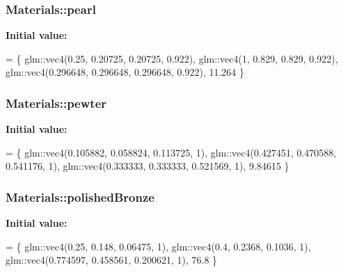 \subsubsection[{\texorpdfstring{pearl}{pearl}}]{ Materials\+::pearl}\hypertarget{namespace_materials_a3b1f30a53ed581645b32a371a3f18518}{}\label{namespace_materials_a3b1f30a53ed581645b32a371a3f18518}
{\bfseries Initial value\+:}
\begin{DoxyCode}
= \{
        glm::vec4(0.25, 0.20725, 0.20725, 0.922),
        glm::vec4(1, 0.829, 0.829, 0.922),
        glm::vec4(0.296648, 0.296648, 0.296648, 0.922),
        11.264
    \}
\end{DoxyCode}
\subsubsection[{\texorpdfstring{pewter}{pewter}}]{ Materials\+::pewter}\hypertarget{namespace_materials_a125b4c95ab2ef64d802378762572abea}{}\label{namespace_materials_a125b4c95ab2ef64d802378762572abea}
{\bfseries Initial value\+:}
\begin{DoxyCode}
= \{
        glm::vec4(0.105882, 0.058824, 0.113725, 1),
        glm::vec4(0.427451, 0.470588, 0.541176, 1),
        glm::vec4(0.333333, 0.333333, 0.521569, 1),
        9.84615
    \}
\end{DoxyCode}
\subsubsection[{\texorpdfstring{polished\+Bronze}{polishedBronze}}]{ Materials\+::polished\+Bronze}\hypertarget{namespace_materials_a74ca93b9b8f4b91eac56e29dcf2f4fb4}{}\label{namespace_materials_a74ca93b9b8f4b91eac56e29dcf2f4fb4}
{\bfseries Initial value\+:}
\begin{DoxyCode}
= \{
        glm::vec4(0.25, 0.148, 0.06475, 1),
        glm::vec4(0.4, 0.2368, 0.1036, 1),
        glm::vec4(0.774597, 0.458561, 0.200621, 1),
        76.8
    \}
\end{DoxyCode}
